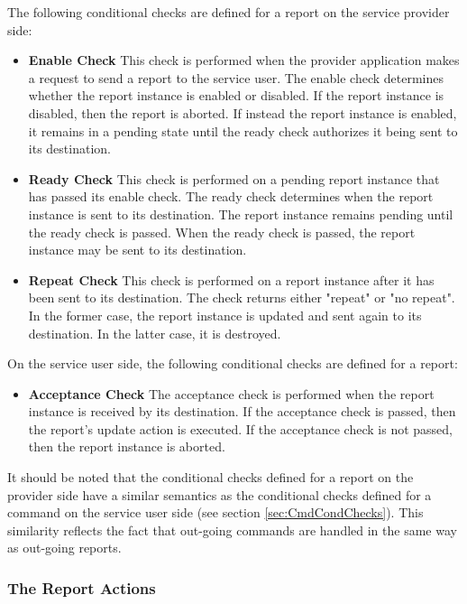 The following conditional checks are defined for a report on the service provider side:

\begin{itemize}
\item \textbf{Enable Check}
This check is performed when the provider application makes a request to send a report to the service user. The enable check determines whether the report instance is enabled or disabled. If the report instance is disabled, then the report is aborted. If instead the report instance is enabled, it remains in a pending state until the ready check authorizes it being sent to its destination.

\item \textbf{Ready Check}
This check is performed on a pending report instance that has passed its enable check. The ready check determines when the report instance is sent to its destination.  The report instance remains pending until the ready check is passed. When the ready check is passed, the report instance may be sent to its destination.  

\item \textbf{Repeat Check}
This check is performed on a report instance after it has been sent to its destination. The check returns either "repeat" or "no repeat". In the former case, the report instance is updated and sent again to its destination. In the latter case, it is destroyed.
\end{itemize}

On the service user side, the following conditional checks are defined for a report:

\begin{itemize}
\item \textbf{Acceptance Check}
The acceptance check is performed when the report instance is received by its destination. If the acceptance check is passed, then the report's update action is executed. If the acceptance check is not passed, then the report instance is aborted.
\end{itemize}

It should be noted that the conditional checks defined for a report on the provider side have a similar semantics as the conditional checks defined for a command on the service user side (see section \ref{sec:CmdCondChecks}). This similarity reflects the fact that out-going commands are handled in the same way as out-going reports.

\subsubsection{The Report Actions}\label{sec:RepActions}

